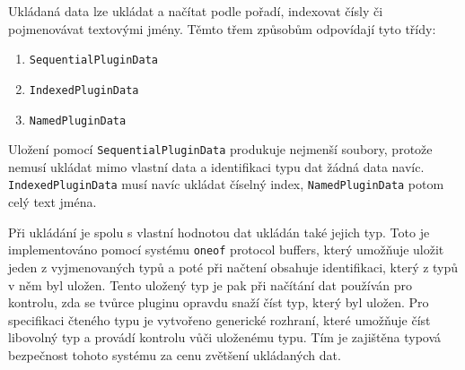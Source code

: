 Ukládaná data lze ukládat a načítat podle pořadí, indexovat čísly či pojmenovávat textovými jmény. Těmto třem způsobům odpovídají tyto třídy:
\begin{enumerate}
	\item \texttt{SequentialPluginData}
	\item \texttt{IndexedPluginData}
	\item \texttt{NamedPluginData}
\end{enumerate}

Uložení pomocí \texttt{SequentialPluginData} produkuje nejmenší soubory, protože nemusí ukládat mimo vlastní data a identifikaci typu dat žádná data navíc. \texttt{IndexedPluginData} musí navíc ukládat číselný index, \texttt{NamedPluginData} potom celý text jména.

Při ukládání je spolu s vlastní hodnotou dat ukládán také jejich typ. Toto je implementováno pomocí systému \texttt{oneof} protocol buffers, který umožňuje uložit jeden z vyjmenovaných typů a poté při načtení obsahuje identifikaci, který z typů v něm byl uložen. Tento uložený typ je pak při načítání dat používán pro kontrolu, zda se tvůrce pluginu opravdu snaží číst typ, který byl uložen. Pro specifikaci čteného typu je vytvořeno generické rozhraní, které umožňuje číst libovolný typ a provádí kontrolu vůči uloženému typu. Tím je zajištěna typová bezpečnost tohoto systému za cenu zvětšení ukládaných dat.


